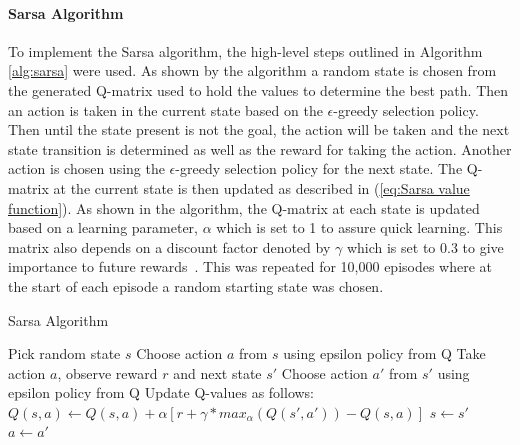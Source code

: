\documentclass[12pt,american]{report}
\providecommand{\DIFaddtex}[1]{{\protect\color{blue}\uwave{#1}}} %
\providecommand{\DIFdeltex}[1]{{\protect\color{red}\sout{#1}}}                      %
\providecommand{\DIFaddbegin}{} %
\providecommand{\DIFaddend}{} %
\providecommand{\DIFdelbegin}{} %
\providecommand{\DIFdelend}{} %
\providecommand{\DIFadd}[1]{\texorpdfstring{\DIFaddtex{#1}}{#1}} %
\providecommand{\DIFdel}[1]{\texorpdfstring{\DIFdeltex{#1}}{}} %
\newcommand{\DIFscaledelfig}{0.5}
\newlength{\DIFdelgraphicswidth} %
\newlength{\DIFdelgraphicsheight} %
\newcommand{\DIFaddincludegraphics}[2][]{{\color{blue}\fbox{\DIFOincludegraphics[#1]{#2}}}} %
\newcommand{\DIFdelincludegraphics}[2][]{%
\sbox{\DIFdelgraphicsbox}{\DIFOincludegraphics[#1]{#2}}%
\settoboxwidth{\DIFdelgraphicswidth}{\DIFdelgraphicsbox} %
\settoboxtotalheight{\DIFdelgraphicsheight}{\DIFdelgraphicsbox} %
\scalebox{\DIFscaledelfig}{%
\parbox[b]{\DIFdelgraphicswidth}{\usebox{\DIFdelgraphicsbox}\\[-\baselineskip] \rule{\DIFdelgraphicswidth}{0em}}\llap{\resizebox{\DIFdelgraphicswidth}{\DIFdelgraphicsheight}{%
\setlength{\unitlength}{\DIFdelgraphicswidth}%
\begin{picture}(1,1)%
\thicklines\linethickness{2pt} %
{\color[rgb]{1,0,0}\put(0,0){\framebox(1,1){}}}%
{\color[rgb]{1,0,0}\put(0,0){\line( 1,1){1}}}%
{\color[rgb]{1,0,0}\put(0,1){\line(1,-1){1}}}%
\end{picture}%
}\hspace*{3pt}}} %
} %
\DeclareRobustCommand{\DIFaddbegin}{\DIFOaddbegin \let\includegraphics\DIFaddincludegraphics} %
\DeclareRobustCommand{\DIFaddend}{\DIFOaddend \let\includegraphics\DIFOincludegraphics} %
\DeclareRobustCommand{\DIFdelbegin}{\DIFOdelbegin \let\includegraphics\DIFdelincludegraphics} %
\DeclareRobustCommand{\DIFdelend}{\DIFOaddend \let\includegraphics\DIFOincludegraphics} %
\begin{document}
\paragraph{Sarsa Algorithm}
To implement the Sarsa algorithm, the high-level steps outlined in Algorithm \ref{alg:sarsa} were used.  As shown by the algorithm a random state is chosen from the generated Q-matrix used to hold the values to determine the best path.  Then an action is taken in the current state based on the \begin{math}\epsilon\end{math}-greedy selection policy.  Then until the state present is not the goal, the action will be taken and the next state transition is determined as well as the reward for taking the action. Another action is chosen using the \begin{math}\epsilon\end{math}-greedy selection policy for the next state. The Q-matrix at the current state is then updated as described in (\ref{eq:Sarsa value function}). As shown in the algorithm, the Q-matrix at each state is updated based on a learning parameter, \begin{math}\alpha\end{math} which is set to 1 to assure quick learning. This matrix also depends on a discount factor denoted by \begin{math}\gamma\end{math} which is set to 0.3 to give importance to future rewards~\cite{Eden}. This was repeated for 10,000 episodes where at the start of each episode a random starting state was chosen.



\begin{algorithm}
\caption{Sarsa Algorithm~\cite{Eden}}
\label{alg:sarsa}
\begin{algorithmic} 
\State Pick random state $s$
\State Choose action $a$ from $s$ using epsilon policy from Q
\State Take action $a$, observe reward $r$ and next state $s'$
\State Choose action $a'$ from $s'$ using epsilon policy from Q
\State Update Q-values as follows:
\State \DIFdelbegin \DIFdel{$Q(s,a) \leftarrow Q(s,a) + \alpha [r+ \gamma*max_{\alpha}(Q(s',a')) - Q(s,a)] $
}\DIFdelend \DIFaddbegin \DIFadd{$Q(s,a) \leftarrow Q(s,a) + \alpha [r+ \gamma*(Q(s',a')) - Q(s,a)] $
}\DIFaddend \State $s \leftarrow s'$
\State $a \leftarrow a'$
\EndWhile
\EndFor
\end{algorithmic}
\end{algorithm}
\end{document}
